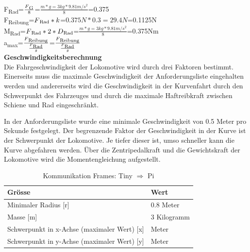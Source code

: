 \documentclass[../../main.tex]{subfiles}
\begin{document}
    F\textsubscript{Rad}=\(\frac{F\textsubscript{G}}{8}\)=\(\frac{m*g=3kg*9.81m/s^2}{8}\)=0.375\\

    F\textsubscript{Reibung}=\(F\textsubscript{Rad}*k\)=\(0.375N*0.3=29.4N\)=0.1125N\\

    M\textsubscript{Rad}=\(F\textsubscript{Rad}*2*D\textsubscript{Rad}\)=\(\frac{m*g=3kg*9.81m/s^2}{8}\)=0.375Nm\\

    a\textsubscript{max}=\(\frac{F\textsubscript{Reibung}}{\frac{F\textsubscript{Rad}}{g}}\)=\(\frac{F\textsubscript{Reibung}}{\frac{F\textsubscript{Rad}}{g}}\)\\

    \textbf{Geschwindigkeitsberechnung}\\
    Die Fahrgeschwindigkeit der Lokomotive wird durch drei Faktoren bestimmt. Einerseits muss die maximale Geschwindigkeit der Anforderungsliste eingehalten werden und andererseits wird die Geschwindigkeit in der Kurvenfahrt durch den Schwerpunkt des Fahrzeuges und durch die maximale Haftreibkraft zwischen Schiene und Rad eingeschränkt.

    In der Anforderungsliste wurde eine minimale Geschwindigkeit von 0.5 Meter pro Sekunde festgelegt. Der begrenzende Faktor der Geschwindigkeit in der Kurve ist der Schwerpunkt der Lokomotive. Je tiefer dieser ist, umso schneller kann die Kurve abgefahren werden. Über die Zentripedalkraft und die Gewichtskraft der Lokomotive wird die Momentengleichung aufgestellt. 

    \begin{table}[H] \centering
        \begin{tabular}{|l|l|}
        \hline
        \textbf{Grösse} & \textbf{Wert}\\
        \hline
        Minimaler Radius  [r]                               & 0.8 Meter\\
         \hline
        Masse [m]                                           & 3 Kilogramm\\
        \hline
        Schwerpunkt in x-Achse (maximaler Wert) [x]         & Meter\\
        \hline
        Schwerpunkt in y-Achse (maximaler Wert) [y]         & Meter\\
        \hline
        \end{tabular}\\
        
        \caption{Kommunikation Frames: Tiny $\Rightarrow$ Pi}
        \label{tab:com_tiny_pi}
        \end{table}
\end{document}

